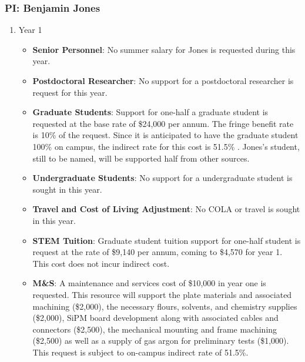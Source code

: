 \newpage

\subsubsection{\bf PI: Benjamin Jones}

\begin{enumerate}

\item{Year 1}

\begin{itemize}[noitemsep,nolistsep]

\item{{\bf Senior Personnel}: No summer salary for Jones is requested during this year.}

\item {{\bf Postdoctoral Researcher}: No support for a postdoctoral researcher is request for this year.} 

\item{{\bf Graduate Students}: Support for one-half a graduate student is requested at the base rate of \$24,000 per annum.   The fringe benefit rate is 10\% of the request.  Since it is anticipated to have the graduate student 100\% on campus, the indirect rate for this cost is 51.5\% .  Jones’s student, still to be named, will be supported half from other sources.}

\item {{\bf Undergraduate Students}: No support for a undergraduate student is sought in this year.}

\item{{\bf Travel and Cost of Living Adjustment}: No COLA or travel is sought in this year.}

\item {{\bf STEM Tuition}: Graduate student tuition support for one-half student is request at the rate of \$9,140 per annum, coming to \$4,570 for year 1.  This cost does not incur indirect cost.}

\item {{\bf M\&S}: A maintenance and services cost of \$10,000 in year one is requested. This resource will support the plate materials and associated machining (\$2,000), the necessary flours, solvents, and chemistry supplies (\$2,000), SiPM board development along with associated cables and connectors (\$2,500), the mechanical mounting and frame machining (\$2,500)  as well as a supply of gas argon for preliminary tests (\$1,000). This request is subject to on-campus indirect rate of 51.5\%.}


\end{itemize}
\end{enumerate}

